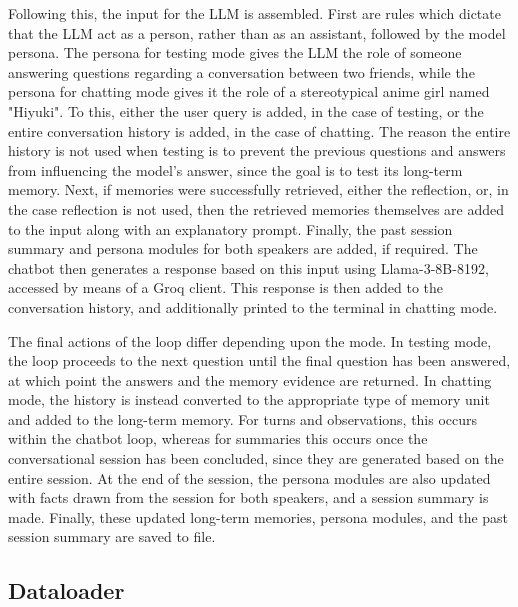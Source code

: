 Following this, the input for the LLM is assembled. First are rules which dictate that the LLM act as a person, rather than as an assistant, followed by the model persona. The persona for testing mode gives the LLM the role of someone answering questions regarding a conversation between two friends, while the persona for chatting mode gives it the role of a stereotypical anime girl named "Hiyuki". To this, either the user query is added, in the case of testing, or the entire conversation history is added, in the case of chatting. The reason the entire history is not used when testing is to prevent the previous questions and answers from influencing the model's answer, since the goal is to test its long-term memory. Next, if memories were successfully retrieved, either the reflection, or, in the case reflection is not used, then the retrieved memories themselves are added to the input along with an explanatory prompt. Finally, the past session summary and persona modules for both speakers are added, if required. The chatbot then generates a response based on this input using Llama-3-8B-8192, accessed by means of a Groq client. This response is then added to the conversation history, and additionally printed to the terminal in chatting mode. 

The final actions of the loop differ depending upon the mode. In testing mode, the loop proceeds to the next question until the final question has been answered, at which point the answers and the memory evidence are returned. In chatting mode, the history is instead converted to the appropriate type of memory unit and added to the long-term memory. For turns and observations, this occurs within the chatbot loop, whereas for summaries this occurs once the conversational session has been concluded, since they are generated based on the entire session. At the end of the session, the persona modules are also updated with facts drawn from the session for both speakers, and a session summary is made. Finally, these updated long-term memories, persona modules, and the past session summary are saved to file.


\subsection{Dataloader}

